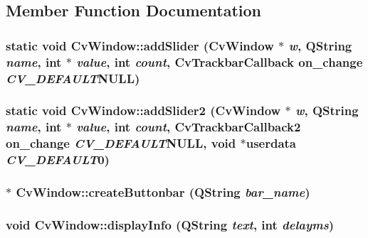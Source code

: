 \subsection{Member Function Documentation}
\hypertarget{classCvWindow_a05ec675f9af0cee666d6a93e3c58109e}{
\subsubsection[{addSlider}]{\setlength{\rightskip}{0pt plus 5cm}static void CvWindow::addSlider ({\bf CvWindow} $\ast$ {\em w}, \/  QString {\em name}, \/  int $\ast$ {\em value}, \/  int {\em count}, \/  CvTrackbarCallback on\_\-change  {\em CV\_\-DEFAULT}NULL)}}
\label{classCvWindow_a05ec675f9af0cee666d6a93e3c58109e}
\hypertarget{classCvWindow_aeca1caf779085a23606e45bf76bbb265}{
\subsubsection[{addSlider2}]{\setlength{\rightskip}{0pt plus 5cm}static void CvWindow::addSlider2 ({\bf CvWindow} $\ast$ {\em w}, \/  QString {\em name}, \/  int $\ast$ {\em value}, \/  int {\em count}, \/  CvTrackbarCallback2 on\_\-change  {\em CV\_\-DEFAULT}NULL, \/  void $\ast$userdata  {\em CV\_\-DEFAULT}0)}}
\label{classCvWindow_aeca1caf779085a23606e45bf76bbb265}
\hypertarget{classCvWindow_a219c9032d1611f4e394eae3dea4011ab}{
\subsubsection[{createButtonbar}]{ $\ast$ CvWindow::createButtonbar (QString {\em bar\_\-name})}}
\label{classCvWindow_a219c9032d1611f4e394eae3dea4011ab}
\hypertarget{classCvWindow_a577841174681451e47735cc125de0af9}{
\subsubsection[{displayInfo}]{\setlength{\rightskip}{0pt plus 5cm}void CvWindow::displayInfo (QString {\em text}, \/  int {\em delayms})}}
